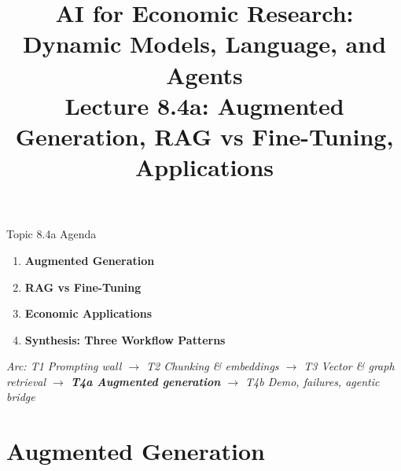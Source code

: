 


\usepackage{colortbl}

\usetikzlibrary{arrows.meta, positioning, shapes.geometric, fit, calc, backgrounds}

\graphicspath{{./pic/}{./figures/}{../../MiniCourse_8hr/Slides/Module4_Agentic_AI/pic/}{../}}

\title[AI for Econ Research]{AI for Economic Research: Dynamic Models, Language, and Agents\\
Lecture 8.4a: Augmented Generation, RAG vs Fine-Tuning, Applications}



\makebeamertitle

\begin{frame}{Topic 8.4a Agenda}
\begin{enumerate}
  \item \textbf{Augmented Generation}
  \medskip
  \item \textbf{RAG vs Fine-Tuning}
  \medskip
  \item \textbf{Economic Applications}
  \medskip
  \item \textbf{Synthesis: Three Workflow Patterns}
\end{enumerate}

\medskip
\textit{Arc: T1 Prompting wall $\to$ T2 Chunking \& embeddings $\to$ T3 Vector \& graph retrieval $\to$ \textbf{T4a Augmented generation} $\to$ T4b Demo, failures, agentic bridge}
\end{frame}

\section{Augmented Generation}

